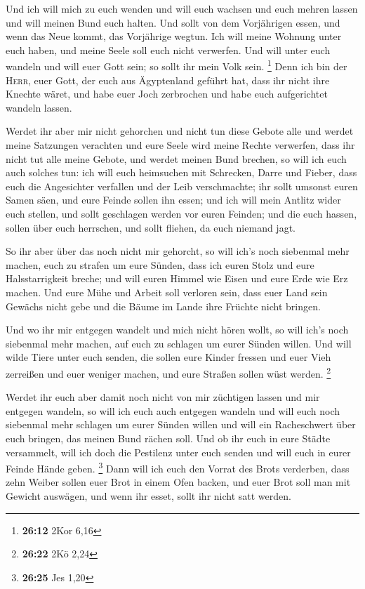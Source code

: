  Und ich will mich zu euch wenden und will euch wachsen
und euch mehren lassen und will meinen Bund euch halten. 
Und sollt von dem Vorjährigen essen, und wenn das Neue kommt, das
Vorjährige wegtun.  Ich will meine Wohnung unter euch
haben, und meine Seele soll euch nicht verwerfen.  Und
will unter euch wandeln und will euer Gott sein; so sollt ihr mein Volk
sein. \footnote{\textbf{26:12} 2Kor 6,16}  Denn ich bin
der \textsc{Herr}, euer Gott, der euch aus Ägyptenland geführt hat, dass
ihr nicht ihre Knechte wäret, und habe euer Joch zerbrochen und habe
euch aufgerichtet wandeln lassen.

 Werdet ihr aber mir nicht gehorchen und nicht tun diese
Gebote alle  und werdet meine Satzungen verachten und
eure Seele wird meine Rechte verwerfen, dass ihr nicht tut alle meine
Gebote, und werdet meinen Bund brechen,  so will ich euch
auch solches tun: ich will euch heimsuchen mit Schrecken, Darre und
Fieber, dass euch die Angesichter verfallen und der Leib verschmachte;
ihr sollt umsonst euren Samen säen, und eure Feinde sollen ihn essen;
 und ich will mein Antlitz wider euch stellen, und sollt
geschlagen werden vor euren Feinden; und die euch hassen, sollen über
euch herrschen, und sollt fliehen, da euch niemand jagt.

 So ihr aber über das noch nicht mir gehorcht, so will
ich's noch siebenmal mehr machen, euch zu strafen um eure Sünden,
 dass ich euren Stolz und eure Halsstarrigkeit breche;
und will euren Himmel wie Eisen und eure Erde wie Erz machen.
 Und eure Mühe und Arbeit soll verloren sein, dass euer
Land sein Gewächs nicht gebe und die Bäume im Lande ihre Früchte nicht
bringen.

 Und wo ihr mir entgegen wandelt und mich nicht hören
wollt, so will ich's noch siebenmal mehr machen, auf euch zu schlagen um
eurer Sünden willen.  Und will wilde Tiere unter euch
senden, die sollen eure Kinder fressen und euer Vieh zerreißen und euer
weniger machen, und eure Straßen sollen wüst werden. \footnote{\textbf{26:22}
  2Kö 2,24}

 Werdet ihr euch aber damit noch nicht von mir züchtigen
lassen und mir entgegen wandeln,  so will ich euch auch
entgegen wandeln und will euch noch siebenmal mehr schlagen um eurer
Sünden willen  und will ein Racheschwert über euch
bringen, das meinen Bund rächen soll. Und ob ihr euch in eure Städte
versammelt, will ich doch die Pestilenz unter euch senden und will euch
in eurer Feinde Hände geben. \footnote{\textbf{26:25} Jes 1,20}
 Dann will ich euch den Vorrat des Brots verderben, dass
zehn Weiber sollen euer Brot in einem Ofen backen, und euer Brot soll
man mit Gewicht auswägen, und wenn ihr esset, sollt ihr nicht satt
werden.


